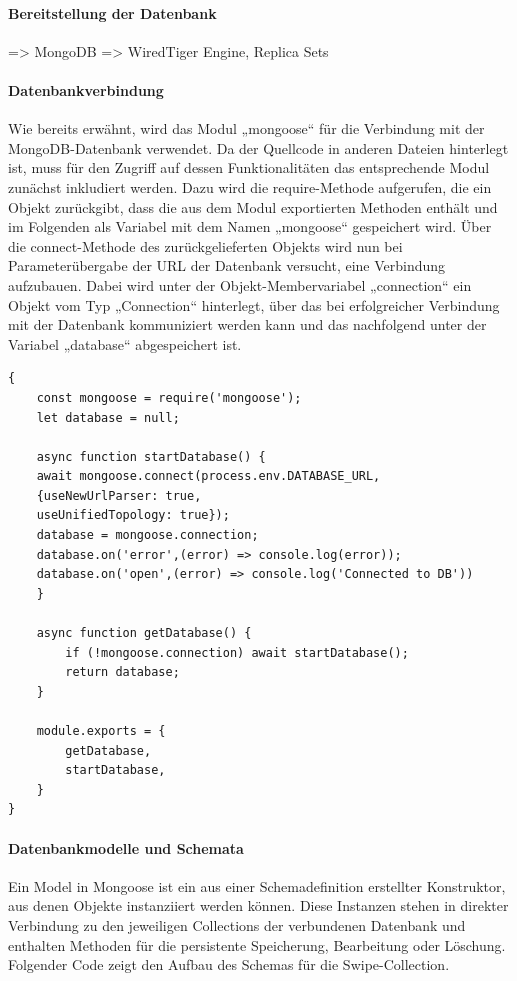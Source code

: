 \paragraph{Bereitstellung der Datenbank}
=> MongoDB 
=> WiredTiger Engine, Replica Sets

\paragraph{Datenbankverbindung}
Wie bereits erwähnt, wird das Modul „mongoose“ für die Verbindung mit der MongoDB-Datenbank verwendet. 
Da der Quellcode in anderen Dateien hinterlegt ist, muss für den Zugriff auf dessen Funktionalitäten das entsprechende Modul zunächst inkludiert werden. Dazu wird die require-Methode aufgerufen, die ein Objekt zurückgibt, dass die aus dem Modul exportierten Methoden enthält und im Folgenden als Variabel mit dem Namen „mongoose“ gespeichert wird. 
\newline
Über die connect-Methode des zurückgelieferten Objekts wird nun bei Parameterübergabe der URL der Datenbank versucht, eine Verbindung aufzubauen.  
Dabei wird unter der Objekt-Membervariabel  „connection“ ein Objekt vom Typ „Connection“ hinterlegt, über das bei erfolgreicher Verbindung mit der Datenbank kommuniziert werden kann und das nachfolgend unter der Variabel „database“ abgespeichert ist. 

\begin{lstlisting}[caption=Verbindung zur MongoDB-Datenbank, label=lst:mongodbconnection]
 {
 	const mongoose = require('mongoose');
	let database = null;

	async function startDatabase() {
	await mongoose.connect(process.env.DATABASE_URL, 
	{useNewUrlParser: true,
	useUnifiedTopology: true}); 
  	database = mongoose.connection;
  	database.on('error',(error) => console.log(error));
  	database.on('open',(error) => console.log('Connected to DB'))
	}

	async function getDatabase() {
 	 	if (!mongoose.connection) await startDatabase();
  		return database;
	}

	module.exports = {
  		getDatabase,
  		startDatabase,
	}
}
\end{lstlisting}

\paragraph{Datenbankmodelle und Schemata}

Ein Model in Mongoose ist ein aus einer Schemadefinition erstellter Konstruktor, aus denen Objekte instanziiert werden können. Diese Instanzen stehen in direkter Verbindung zu den jeweiligen Collections der verbundenen Datenbank und enthalten Methoden für die persistente Speicherung, Bearbeitung oder Löschung.
\newline
Folgender Code zeigt den Aufbau des Schemas für die Swipe-Collection. 

